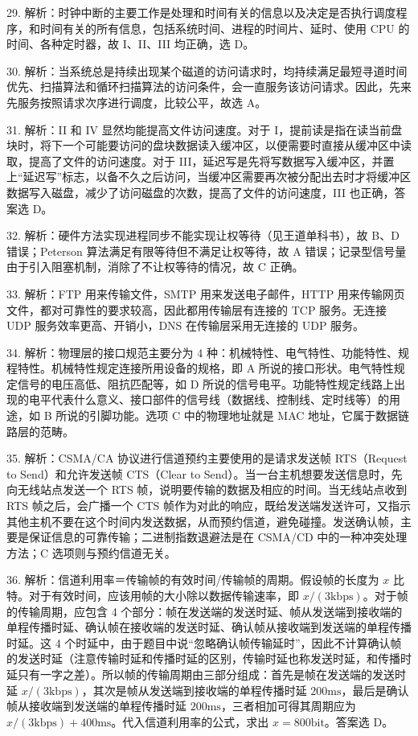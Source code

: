 \documentclass[UTF8,11pt]{ctexart}
\begin{document}
29. 解析：时钟中断的主要工作是处理和时间有关的信息以及决定是否执行调度程序，和时间有关的所有信息，包括系统时间、进程的时间片、延时、使用 CPU 的时间、各种定时器，故 I、II、III 均正确，选 D。


30. 解析：当系统总是持续出现某个磁道的访问请求时，均持续满足最短寻道时间优先、扫描算法和循环扫描算法的访问条件，会一直服务该访问请求。因此，先来先服务按照请求次序进行调度，比较公平，故选 A。


31. 解析：II 和 IV 显然均能提高文件访问速度。对于 I，提前读是指在读当前盘块时，将下一个可能要访问的盘块数据读入缓冲区，以便需要时直接从缓冲区中读取，提高了文件的访问速度。对于 III，延迟写是先将写数据写入缓冲区，并置上“延迟写”标志，以备不久之后访问，当缓冲区需要再次被分配出去时才将缓冲区数据写入磁盘，减少了访问磁盘的次数，提高了文件的访问速度，III 也正确，答案选 D。


32. 解析：硬件方法实现进程同步不能实现让权等待（见王道单科书），故 B、D 错误；Peterson 算法满足有限等待但不满足让权等待，故 A 错误；记录型信号量由于引入阻塞机制，消除了不让权等待的情况，故 C 正确。


33. 解析：FTP 用来传输文件，SMTP 用来发送电子邮件，HTTP 用来传输网页文件，都对可靠性的要求较高，因此都用传输层有连接的 TCP 服务。无连接 UDP 服务效率更高、开销小，DNS 在传输层采用无连接的 UDP 服务。


34. 解析：物理层的接口规范主要分为 4 种：机械特性、电气特性、功能特性、规程特性。机械特性规定连接所用设备的规格，即 A 所说的接口形状。电气特性规定信号的电压高低、阻抗匹配等，如 D 所说的信号电平。功能特性规定线路上出现的电平代表什么意义、接口部件的信号线（数据线、控制线、定时线等）的用途，如 B 所说的引脚功能。选项 C 中的物理地址就是 MAC 地址，它属于数据链路层的范畴。


35. 解析：CSMA/CA 协议进行信道预约主要使用的是请求发送帧 RTS（Request to Send）和允许发送帧 CTS（Clear to Send）。当一台主机想要发送信息时，先向无线站点发送一个 RTS 帧，说明要传输的数据及相应的时间。当无线站点收到 RTS 帧之后，会广播一个 CTS 帧作为对此的响应，既给发送端发送许可，又指示其他主机不要在这个时间内发送数据，从而预约信道，避免碰撞。发送确认帧，主要是保证信息的可靠传输；二进制指数退避法是在 CSMA/CD 中的一种冲突处理方法；C 选项则与预约信道无关。


36. 解析：信道利用率＝传输帧的有效时间/传输帧的周期。假设帧的长度为 \(\displaystyle x\) 比特。对于有效时间，应该用帧的大小除以数据传输速率，即 \(\displaystyle x/(3\mathrm{kbps})\)。对于帧的传输周期，应包含 4 个部分：帧在发送端的发送时延、帧从发送端到接收端的单程传播时延、确认帧在接收端的发送时延、确认帧从接收端到发送端的单程传播时延。这 4 个时延中，由于题目中说“忽略确认帧传输延时”，因此不计算确认帧的发送时延（注意传输时延和传播时延的区别，传输时延也称发送时延，和传播时延只有一字之差）。所以帧的传输周期由三部分组成：首先是帧在发送端的发送时延 \(\displaystyle x/(3\mathrm{kbps})\)，其次是帧从发送端到接收端的单程传播时延 \(\displaystyle 200\mathrm{ms}\)，最后是确认帧从接收端到发送端的单程传播时延 \(\displaystyle 200\mathrm{ms}\)，三者相加可得其周期应为 \(\displaystyle x/(3\mathrm{kbps})+400\mathrm{ms}\)。代入信道利用率的公式，求出 \(\displaystyle x=800\mathrm{bit}\)。答案选 D。
\end{document}
